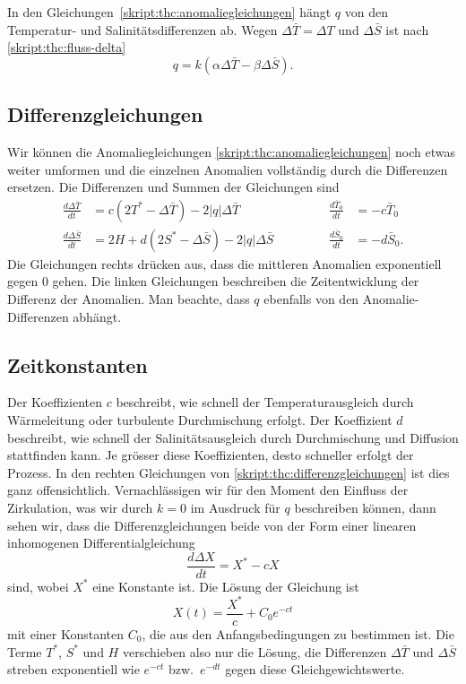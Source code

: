 In den Gleichungen~\eqref{skript:thc:anomaliegleichungen} hängt
$q$ von den Temperatur- und Salinitätsdifferenzen ab.
Wegen $\Delta\bar T=\Delta T$ und $\Delta\bar S$ ist nach
\eqref{skript:thc:fluss-delta}
\begin{equation}
q = k(\alpha\Delta\bar T-\beta \Delta\bar S).
\label{skript:thc:fluss-delta-anomalie}
\end{equation}

\subsection{Differenzgleichungen}
Wir können die Anomaliegleichungen \eqref{skript:thc:anomaliegleichungen}
noch etwas weiter umformen und die einzelnen Anomalien vollständig durch
die Differenzen ersetzen.
Die Differenzen und Summen der Gleichungen sind
\begin{equation}
\begin{aligned}
\frac{d\Delta\bar T}{dt}
&=
c(2T^*-\Delta\bar T)-2|q|\Delta\bar T
&&\qquad&
\frac{d\bar T_0}{dt}
&=
-c\bar T_0
\\
\frac{d\Delta\bar S}{dt}
&=
2H+d(2S^*-\Delta\bar S) - 2|q|\Delta\bar S
&&\qquad&
\frac{d\bar S_0}{dt}
&=
-d\bar S_0.
\end{aligned}
\label{skript:thc:differenzgleichungen}
\end{equation}
Die Gleichungen rechts drücken aus, dass die mittleren Anomalien
exponentiell gegen $0$ gehen.
Die linken Gleichungen beschreiben die Zeitentwicklung der Differenz
der Anomalien.
Man beachte, dass $q$ ebenfalls von den Anomalie-Differenzen abhängt.

\subsection{Zeitkonstanten\label{section:zeitkonstanten}}
\label{skript:thc:zeitkonstanten}
Der Koeffizienten $c$ beschreibt, wie schnell der Temperaturausgleich
durch Wärmeleitung oder turbulente Durchmischung erfolgt.
Der Koeffizient $d$ beschreibt, wie schnell der Salinitätsausgleich
durch Durchmischung und Diffusion stattfinden kann.
Je grösser diese Koeffizienten, desto schneller erfolgt der Prozess.
In den rechten Gleichungen von \eqref{skript:thc:differenzgleichungen}
ist dies ganz offensichtlich.
Vernachlässigen wir für den Moment den Einfluss der Zirkulation,
was wir durch $k=0$ im Ausdruck für $q$ beschreiben können, dann
sehen wir, dass die Differenzgleichungen beide von der Form
einer linearen inhomogenen Differentialgleichung
\[
\frac{d\Delta X}{dt}
=
X^* -cX
\]
sind, wobei $X^*$ eine Konstante ist.
Die Lösung der Gleichung ist
\[
X(t) = \frac{X^*}{c} + C_0 e^{-ct}
\]
mit einer Konstanten $C_0$, die aus den Anfangsbedingungen zu
bestimmen ist.
Die Terme $T^*$, $S^*$ und $H$ verschieben also nur die Lösung,
die Differenzen $\Delta\bar T$ und $\Delta\bar S$ streben exponentiell
wie $e^{-ct}$ bzw.~$e^{-dt}$ gegen diese Gleichgewichtswerte.


